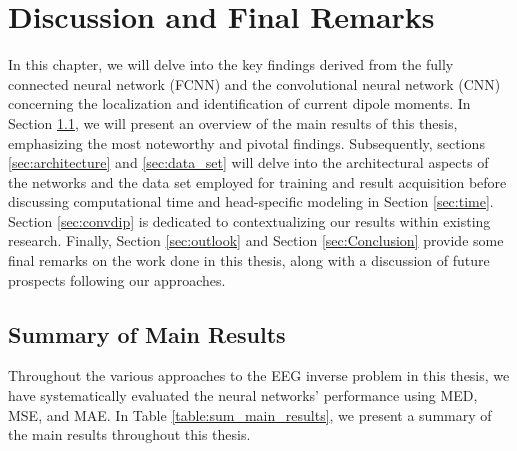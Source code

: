\documentclass[a4paper, UKenglish, 11pt]{uiomaster}
\begin{document}
\chapter{Discussion and Final Remarks}
In this chapter, we will delve into the key findings derived from the fully connected neural network (FCNN) and the convolutional neural network (CNN) concerning the localization and identification of current dipole moments. In Section \ref{sec:results}, we will present an overview of the main results of this thesis, emphasizing the most noteworthy and pivotal findings. Subsequently, sections \ref{sec:architecture} and \ref{sec:data_set} will delve into the architectural aspects of the networks and the data set employed for training and result acquisition before discussing computational time and head-specific modeling in Section \ref{sec:time}. Section \ref{sec:convdip} is dedicated to contextualizing our results within existing research. Finally, Section \ref{sec:outlook} and Section \ref{sec:Conclusion} provide some final remarks on the work done in this thesis, along with a discussion of future prospects following our approaches.

\section{Summary of Main Results} \label{sec:results}
Throughout the various approaches to the EEG inverse problem in this thesis, we have systematically evaluated the neural networks' performance using MED, MSE, and MAE. In Table \ref{table:sum_main_results}, we present a summary of the main results throughout this thesis.
\end{document}
